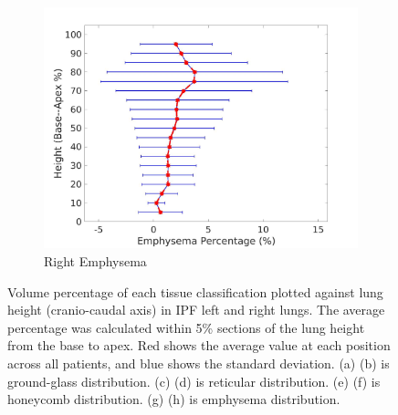 \begin{figure}[H]
\begin{subfigure}{.42\linewidth}
  \includegraphics[width=\linewidth,trim={{.0\wd0} {.0\wd0} {.0\wd0} {.0\wd0}},clip]{QuantitativeAnalysis/Image/RightLungEmphysemaDiseaseAgainstHeight.jpg}
  \caption{Right Emphysema}
  \label{fig:DiseaseAgainstHeight-h}
\end{subfigure}
\caption{Volume percentage of each tissue classification plotted against lung height (cranio-caudal axis) in IPF left and right lungs. The average percentage was calculated within 5\% sections of the lung height from the base to apex. Red shows the average value at each position across all patients, and blue shows the standard deviation. (a) (b) is ground-glass distribution. (c) (d) is reticular distribution. (e) (f) is honeycomb distribution. (g) (h) is emphysema distribution.}
\label{fig:DiseaseAgainstHeight}
\end{figure}

